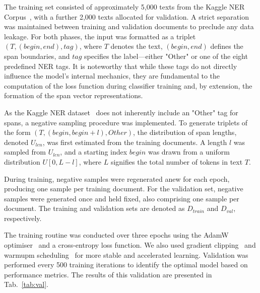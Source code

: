 \documentclass{article}
\begin{document}
The training set consisted of approximately 5,000 texts from the Kaggle NER Corpus~\cite{kagglener}, with a further 2,000 texts allocated for validation. A strict separation was maintained between training and validation documents to preclude any data leakage. For both phases, the input was formatted as a triplet $(T, (begin, end), tag)$, where $T$ denotes the text, $(begin, end)$ defines the span boundaries, and $tag$ specifies the label—either "Other" or one of the eight predefined NER tags. It is noteworthy that while these tags do not directly influence the model's internal mechanics, they are fundamental to the computation of the loss function during classifier training and, by extension, the formation of the span vector representations.

As the Kaggle NER dataset~\cite{kagglener} does not inherently include an "Other" tag for spans, a negative sampling procedure was implemented. To generate triplets of the form $(T, (begin, begin+l), Other)$, the distribution of span lengths, denoted $U_{len}$, was first estimated from the training documents. A length $l$ was sampled from $U_{len}$, and a starting index $begin$ was drawn from a uniform distribution $U[0, L-l]$, where $L$ signifies the total number of tokens in text $T$.

During training, negative samples were regenerated anew for each epoch, producing one sample per training document. For the validation set, negative samples were generated once and held fixed, also comprising one sample per document. The training and validation sets are denoted as $D_{train}$ and $D_{val}$, respectively.

The training routine was conducted over three epochs using the AdamW optimiser~\cite{loshchilov2017fixing} and a cross-entropy loss function. We also used gradient clipping~\cite{zhanggradient} and warmupm scheduling~\cite{kalra2024warmup} for more stable and accelerated learning. Validation was performed every 500 training iterations to identify the optimal model based on performance metrics. The results of this validation are presented in Tab.~\ref{tab:val}.
\end{document}
